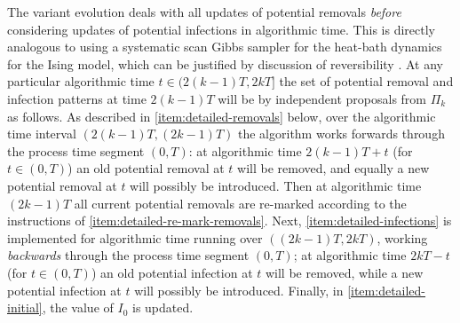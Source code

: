 \documentclass[]{article}
\begin{document}
The variant evolution
deals with all 
updates of potential removals 
\emph{before}
considering updates of
potential infections in algorithmic time.
This is directly analogous to using a systematic scan Gibbs sampler
for the heat-bath dynamics for the Ising model,
which can be justified by
discussion of reversibility
\citep[see][Section 1.4]{Geyer-1999}.%
At any particular algorithmic time \(t\in (2(k{-}1)T, 2kT]\)
the set of potential removal and infection patterns
at time \(2(k{-}1)T\) will be
by independent proposals from \(\Pi_k\) as follows.
As described in \ref{item:detailed-removals} below,
over the algorithmic time interval
\((2(k{-}1)T, (2k{-}1)T)\)
the algorithm works forwards
through the process time segment \((0,T)\): 
at algorithmic time \(2(k{-}1)T+t\) (for \(t\in(0,T)\))
an old potential removal at \(t\)
will be removed, 
and equally
a new potential removal at \(t\)
will possibly be introduced.
Then at
algorithmic time \((2k{-}1)T\)
all current potential removals are re-marked according to the instructions
of \ref{item:detailed-re-mark-removals}.
Next, \ref{item:detailed-infections} is implemented for
algorithmic time running over \(((2k{-}1)T, 2kT)\),
working
\emph{backwards}
through the process time segment \((0,T)\);
at algorithmic time \(2kT-t\)  (for \(t\in(0,T)\))
an old potential infection at \(t\) will be removed, 
while a new potential infection at \(t\) will possibly be introduced. Finally, in \ref{item:detailed-initial}, the value of \(I_0\) is updated.
\end{document}
